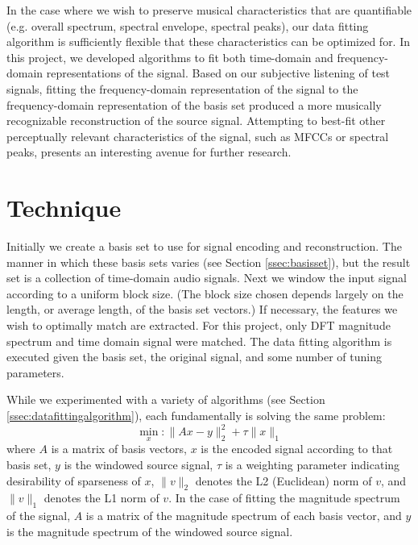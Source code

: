 \documentclass[twoside,a4paper]{article}
\begin{document}
In the case where we wish to preserve musical characteristics that are quantifiable (e.g. overall spectrum, spectral envelope, spectral peaks), our data fitting algorithm is sufficiently flexible that these characteristics can be optimized for. 
In this project, we developed algorithms to fit both time-domain and frequency-domain representations of the signal.
Based on our subjective listening of test signals, fitting the frequency-domain representation of the signal to the frequency-domain representation of the basis set produced a more musically recognizable reconstruction of the source signal. 
Attempting to best-fit other perceptually relevant characteristics of the signal, such as MFCCs or spectral peaks, presents an interesting avenue for further research. 

\section{Technique}

Initially we create a basis set to use for signal encoding and reconstruction. 
The manner in which these basis sets varies (see Section \ref{ssec:basisset}), but the result set is a collection of time-domain audio signals. 
Next we window the input signal according to a uniform block size. 
(The block size chosen depends largely on the length, or average length, of the basis set vectors.) 
If necessary, the features we wish to optimally match are extracted. 
For this project, only DFT magnitude spectrum and time domain signal were matched. 
The data fitting algorithm is executed given the basis set, the original signal, and some number of tuning parameters. 

While we experimented with a variety of algorithms (see Section \ref{ssec:datafittingalgorithm}), each fundamentally is solving the same problem:
\begin{equation}
\min_{x}: \lVert Ax - y \rVert ^2_2 + \tau \lVert x \rVert _1
\end{equation}
where \(A\) is a matrix of basis vectors, \(x\) is the encoded signal according to that basis set, \(y\) is the windowed source signal, \(\tau\) is a weighting parameter indicating desirability of sparseness of \(x\), \(\lVert v \rVert _2\) denotes the L2 (Euclidean) norm of \(v\), and \(\lVert v \rVert _1\) denotes the L1 norm of \(v\). 
In the case of fitting the magnitude spectrum of the signal, \(A\) is a matrix of the magnitude spectrum of each basis vector, and \(y\) is the magnitude spectrum of the windowed source signal. 
\end{document}
